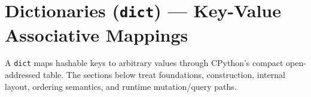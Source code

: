 \section{Dictionaries (\texttt{dict}) --- Key-Value Associative Mappings}

A \texttt{dict} maps hashable keys to arbitrary values through CPython's compact open-addressed table. The sections below treat foundations, construction, internal layout, ordering semantics, and runtime mutation/query paths.
